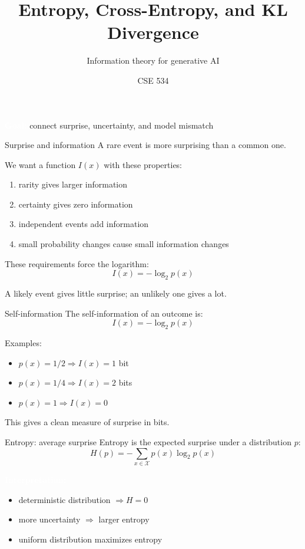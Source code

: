 \documentclass[aspectratio=169]{beamer}
\title{Entropy, Cross-Entropy, and KL Divergence}
\subtitle{Information theory for generative AI}
\author{CSE 534}
\date{}
\renewcommand{\textbf}[1]{\textcolor{white}{\bfseries #1}}
\begin{document}
\begin{frame}
\titlepage
\begin{center}
\textbf{Goal:} connect surprise, uncertainty, and model mismatch
\end{center}
\end{frame}

\begin{frame}[c]{Surprise and information}
A rare event is more surprising than a common one.

\vspace{0.5em}
We want a function $I(x)$ with these properties:
\begin{enumerate}
    \item rarity gives larger information
    \item certainty gives zero information
    \item independent events add information
    \item small probability changes cause small information changes
\end{enumerate}

\vspace{0.5em}
These requirements force the logarithm:
\[
I(x) = -\log_2 p(x)
\]

\vspace{0.5em}
A likely event gives little surprise; an unlikely one gives a lot.
\end{frame}

\begin{frame}[c]{Self-information}
The self-information of an outcome is:
\[
I(x) = -\log_2 p(x)
\]

\vspace{0.5em}
Examples:
\begin{itemize}
    \item $p(x)=1/2 \Rightarrow I(x)=1$ bit
    \item $p(x)=1/4 \Rightarrow I(x)=2$ bits
    \item $p(x)=1 \Rightarrow I(x)=0$
\end{itemize}

\vspace{0.5em}
This gives a clean measure of surprise in bits.
\end{frame}

\begin{frame}[c]{Entropy: average surprise}
Entropy is the expected surprise under a distribution $p$:
\[
H(p) = -\sum_{x \in \mathcal{X}} p(x)\log_2 p(x)
\]

\vspace{0.5em}
\textbf{Interpretation:}
\begin{itemize}
    \item deterministic distribution $\Rightarrow H=0$
    \item more uncertainty $\Rightarrow$ larger entropy
    \item uniform distribution maximizes entropy
\end{itemize}
\end{frame}
\end{document}
